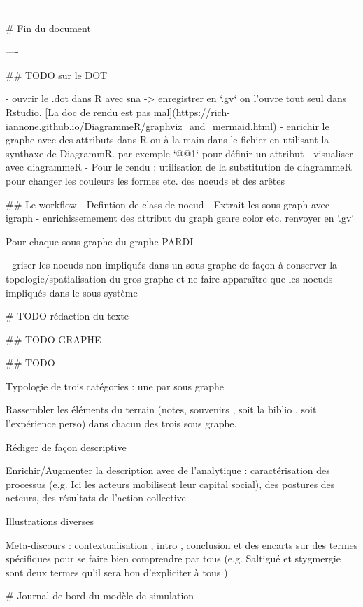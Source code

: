 ----

# Fin du document 

----

## TODO sur le DOT



- ouvrir le .dot dans R avec sna -> enregistrer en `.gv` on l'ouvre tout seul dans Rstudio. [La doc de rendu est pas mal](https://rich-iannone.github.io/DiagrammeR/graphviz_and_mermaid.html)
- enrichir le graphe avec des attributs dans R ou à la main dans le fichier en utilisant la synthaxe de DiagrammR. par exemple `@@1` pour définir un attribut 
- visualiser avec diagrammeR
- Pour le rendu : utilisation de la substitution de diagrammeR pour changer les couleurs les formes etc.  des noeuds et des arêtes

## Le workflow
- Defintion de class de noeud
- Extrait les sous graph avec igraph
- enrichissemement des attribut du graph genre color etc.
renvoyer en `.gv`

Pour chaque sous graphe du graphe PARDI 

-  griser les noeuds non-impliqués dans un sous-graphe de façon à conserver la topologie/spatialisation du gros graphe et ne faire apparaître que les noeuds impliqués dans le sous-système



# TODO rédaction du texte 

## TODO GRAPHE

## TODO 

Typologie de trois catégories : une par sous graphe 

Rassembler les éléments du terrain (notes, souvenirs , soit la biblio , soit l'expérience perso) dans chacun des trois sous graphe.

Rédiger de façon descriptive

Enrichir/Augmenter la description avec de l'analytique  : caractérisation des processus (e.g. Ici les acteurs mobilisent leur capital social), des postures des acteurs, des résultats de l'action collective 


Illustrations diverses

Meta-discours : contextualisation , intro , conclusion et des encarts sur des termes spécifiques pour se faire bien comprendre par tous (e.g. Saltigué et stygmergie sont deux termes qu'il sera bon d'expliciter à tous )






# Journal de bord du modèle de simulation


